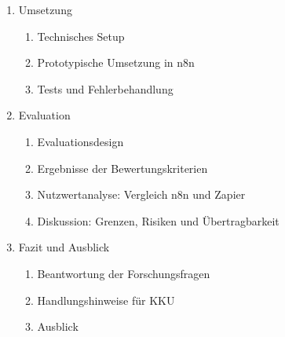 ﻿\documentclass[a4paper,11pt]{article}
\begin{document}
\begin{enumerate}
\begin{enumerate}
        \item BPMN Soll-Modell
        \item Lösungsarchitektur in n8n
        \item Abgrenzung zur Zapier-Umsetzung
    \end{enumerate}
    \item Umsetzung
    \begin{enumerate}
        \item Technisches Setup
        \item Prototypische Umsetzung in n8n
        \item Tests und Fehlerbehandlung
    \end{enumerate}
    \item Evaluation
    \begin{enumerate}
        \item Evaluationsdesign
        \item Ergebnisse der Bewertungskriterien
        \item Nutzwertanalyse: Vergleich n8n und Zapier
        \item Diskussion: Grenzen, Risiken und Übertragbarkeit
    \end{enumerate}
    \item Fazit und Ausblick
    \begin{enumerate}
        \item Beantwortung der Forschungsfragen
        \item Handlungshinweise für KKU
        \item Ausblick
    \end{enumerate}
\end{enumerate}
\end{document}
